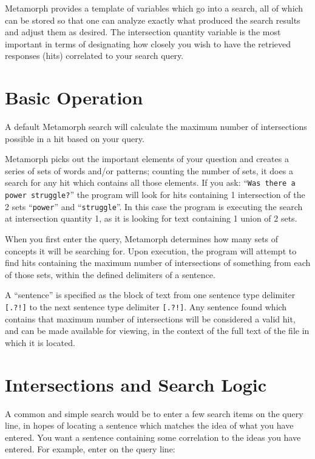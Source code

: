 Metamorph provides a template of variables which go into a search,
all of which can be stored so that one can analyze exactly
what produced the search results and adjust them as desired.  The
intersection quantity variable is the most important in terms of
designating how closely you wish to have the retrieved responses
(hits) correlated to your search query.


\section{Basic Operation}

A default Metamorph search will calculate the maximum number of
intersections possible in a hit based on your query.

Metamorph picks out the important elements of your question and
creates a series of sets of words and/or patterns; counting the number
of sets, it does a search for any hit which contains all those
elements.  If you ask:  ``\verb`Was there a power struggle?`'' the
program will look for hits containing 1 intersection of the 2 sets
``\verb`power`'' and ``\verb`struggle`''.  In this case the program is
executing the search at intersection quantity 1, as it is looking for
text containing 1 union of 2 sets.

When you first enter the query, Metamorph determines how many sets of
concepts it will be searching for.  Upon execution, the program will
attempt to find hits containing the maximum number of intersections of
something from each of those sets, within the defined delimiters of a
sentence.

A ``sentence'' is specified as the block of text from one sentence
type delimiter \verb`[.?!]` to the next sentence type delimiter
\verb`[.?!]`.  Any sentence found which contains that maximum number
of intersections will be considered a valid hit, and can be made
available for viewing, in the context of the full text of the file in
which it is located.


\section{Intersections and Search Logic}

A common and simple search would be to enter a few search items on the
query line, in hopes of locating a sentence which matches the idea of
what you have entered.  You want a sentence containing some
correlation to the ideas you have entered.  For example, enter on the
query line:

